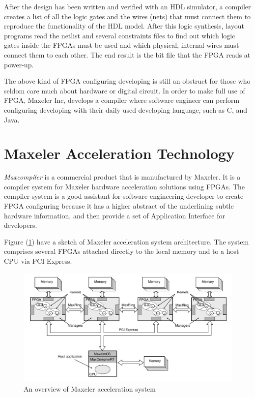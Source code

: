 After the design has been written and verified with an HDL simulator,
a compiler creates a list of all the logic gates and the wires (nets)
that must connect them to reproduce the functionality of the HDL model.
After this logic synthesis, layout programs read the netlist and several
constraints files to find out which logic gates inside the FPGAs must
be used and which physical, internal wires must connect them to each
other. The end result is the bit file that the FPGA reads at power-up.

The above kind of FPGA configuring developing is still an obstruct for
those who seldom care much about hardware or digital circuit. In order to
make full use of FPGA, Maxeler Inc, develops a compiler where software
engineer can perform configuring developing with their daily used
developing language, such as C, and Java.

\section{Maxeler Acceleration Technology}

\emph{Maxcompiler} is a commercial product that is manufactured by Maxeler.
It is a compiler system for Maxeler hardware acceleration solutions using
FPGAs. The compiler system is a good assistant for software engineering
developer to create FPGA configuring because it has a higher abstract of
the underlining subtle hardware information, and then provide a set of
Application Interface for developers.

Figure (\ref{fig:maxeler_acceleration_system}) have a sketch of Maxeler
acceleration system architecture. The system comprises several FPGAs
attached directly to the local memory and to a host CPU via PCI Express.

\begin{figure}
  \centering
  \includegraphics[scale=0.35]{img/overview_of_maxeler_acceleration_system.png}
  \caption{An overview of Maxeler acceleration system}
  \label{fig:maxeler_acceleration_system}
\end{figure}

